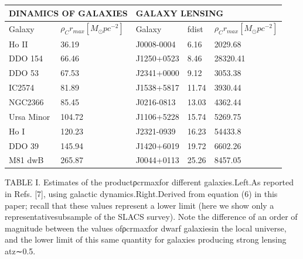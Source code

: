 \documentclass[10pt]{article}
\begin{document}
\begin{table}[h!]
	\centering
	\begin{tabular}{|l|l|l|l|l|} 
		\hline
		\multicolumn{2}{|l|}{\textbf{\centering DINAMICS OF GALAXIES}} & \multicolumn{3}{l|}{\textbf{\centering GALAXY LENSING}}  \\ 
		\hline
		Galaxy     & \(\rho_{C}r_{max}[M_{\odot}pc^{-2}]\)                          & Galaxy     & fdist & \(\rho_{C}r_{max}[M_{\odot}pc^{-2}]\)              \\ 
		\hline
		Ho II      & 36.19                         & J0008-0004 & 6.16  & 2029.68         \\ 
		\hline
		DDO 154    & 66.46                         & J1250+0523 & 8.46  & 28320.41        \\ 
		\hline
		DDO 53     & 67.53                         & J2341+0000 & 9.12  & 3053.38         \\ 
		\hline
		IC2574     & 81.89                         & J1538+5817 & 11.74 & 3930.44         \\ 
		\hline
		NGC2366    & 85.45                         & J0216-0813 & 13.03 & 4362.44         \\ 
		\hline
		Ursa Minor & 104.72                        & J1106+5228 & 15.74 & 5269.75         \\ 
		\hline
		Ho I       & 120.23                        & J2321-0939 & 16.23 & 54433.8         \\ 
		\hline
		DDO 39     & 145.94                        & J1420+6019 & 19.72 & 6602.26         \\ 
		\hline
		M81 dwB    & 265.87                        & J0044+0113 & 25.26 & 8457.05         \\
		\hline
	\end{tabular}
\end{table} \label{table:1}
TABLE  I.   Estimates  of  the  productρcrmaxfor  different  galaxies.Left.As  reported  in  Refs.   [7],  using  galactic  dynamics.Right.Derived from equation (6) in this paper; recall that these values represent a lower limit (here we show only a representativesubsample of the SLACS survey).  Note the difference of an order of magnitude between the values ofρcrmaxfor dwarf galaxiesin the local universe, and the lower limit of this same quantity for galaxies producing strong lensing atz∼0.5.\\
\end{document}
